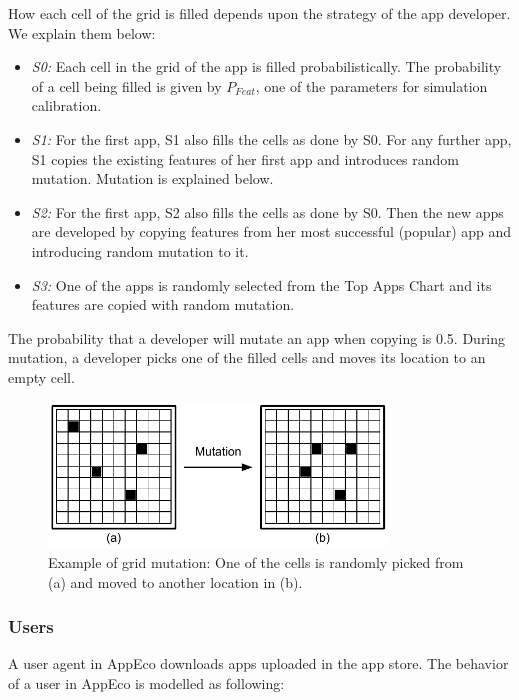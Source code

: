 How each cell of the grid is filled depends upon the strategy of the app developer. We explain them below:

\begin{itemize}
  \item \emph{S0:} Each cell in the grid of the app is filled probabilistically. The probability of a cell being filled is given by $P_{Feat}$, one of the parameters for simulation calibration.
  \item \emph{S1:} For the first app, S1 also fills the cells as done by S0. For any further app, S1 copies the existing features of her first app and introduces random mutation. Mutation is explained below.
  \item \emph{S2:} For the first app, S2 also fills the cells as done by S0. Then the new apps are developed by copying features from her most successful (popular) app and introducing random mutation to it.
  \item \emph{S3:} One of the apps is randomly selected from the Top Apps Chart and its features are copied with random mutation.
\end{itemize}

The probability that a developer will mutate an app when copying is 0.5. During mutation, a developer picks one of the filled cells and moves its location to an empty cell.

\begin{figure}[!htb]
  \centering
  \includegraphics[width=9cm]{figures/example_app_grid_mutation.pdf}
  \caption{Example of grid mutation: One of the cells is randomly picked from (a) and moved to another location in (b).}
  \label{fig:example-grid-mutation}
\end{figure}

\subsubsection*{Users}

A user agent in AppEco downloads apps uploaded in the app store. The behavior of a user in AppEco is modelled as following:

